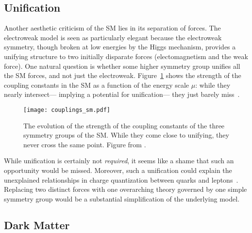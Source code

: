 \subsection{Unification}

Another aesthetic criticism of the SM lies in its separation of forces. The electroweak model is seen as particularly elegant because the electroweak symmetry, though broken at low energies by the Higgs mechanism, provides a unifying structure to two initially disparate forces (electomagnetism and the weak force). One natural question is whether some higher symmetry group unifies all the SM forces, and not just the electroweak. Figure~\ref{fig:susy:couplings_sm} shows the strength of the coupling constants in the SM as a function of the energy scale $\mu$: while they nearly intersect--- implying a potential for unification--- they just barely miss~\cite{susypheno}.



\begin{figure}
\centering
\texttt{[image: couplings\_sm.pdf]}
\label{fig:susy:couplings_sm}
\caption{The evolution of the strength of the coupling constants of the three symmetry groups of the SM. While they come close to unifying, they never cross the same point. Figure from \cite{susypheno}.}
\end{figure}


While unification is certainly not \textit{required}, it seems like a shame that such an opportunity would be missed. Moreover, such a unification could explain the unexplained relationships in charge quantization between quarks and leptons~\cite{SUSYUnification}. Replacing two distinct forces with one overarching theory governed by one simple symmetry group would be a substantial simplification of the underlying model.

\subsection{Dark Matter}


